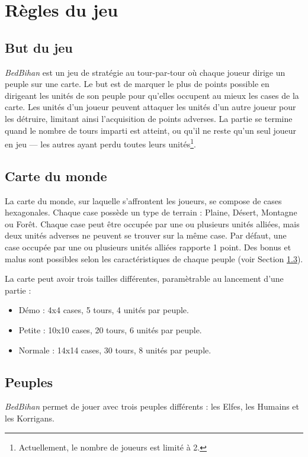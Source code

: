 \newpage
	\section{Règles du jeu}
	\label{sec:regles}

	\subsection{But du jeu}
	\label{subsec:butdujeu}
	\emph{BedBihan} est un jeu de stratégie au tour-par-tour où chaque joueur dirige un peuple sur une carte. Le but est de marquer le plus de points possible en dirigeant les unités de son peuple pour qu'elles occupent au mieux les cases de la carte. Les unités d’un joueur peuvent attaquer les unités d’un autre joueur pour les détruire, limitant ainsi l'acquisition de points adverses. La partie se termine quand le nombre de tours imparti est atteint, ou qu'il ne reste qu'un seul joueur en jeu --- les autres ayant perdu toutes leurs unités\footnote{Actuellement, le nombre de joueurs est limité à 2.}.

	\subsection{Carte du monde}
	\label{subsec:carte}
	La carte du monde, sur laquelle s'affrontent les joueurs, se compose de cases hexagonales. Chaque case possède un type de terrain : Plaine,	Désert, Montagne ou Forêt. Chaque case peut être occupée par une ou plusieurs unités alliées, mais deux unités adverses ne peuvent se trouver sur la même case. Par défaut, une case occupée par une ou plusieurs unités alliées rapporte 1 point. Des bonus et malus sont possibles selon les caractéristiques de chaque peuple (voir Section \ref{subsec:peuples}). 
	
	La carte peut avoir trois tailles différentes, paramètrable au lancement d'une partie :
	\begin{itemize}
		\item Démo : 4x4 cases, 5 tours, 4 unités par peuple.
		\item Petite : 10x10 cases, 20 tours, 6 unités par peuple.
		\item Normale : 14x14 cases, 30 tours, 8 unités par peuple.
	\end{itemize}
	
	
	\subsection{Peuples}
	\label{subsec:peuples}
	\emph{BedBihan} permet de jouer avec trois peuples différents : les Elfes, les Humains et les Korrigans. 
	
